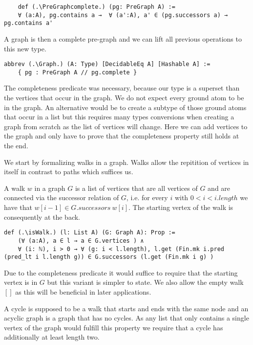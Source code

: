 \begin{lstlisting}
    def (.\PreGraphcomplete.) (pg: PreGraph A) := 
    ∀ (a:A), pg.contains a →  ∀ (a':A), a' ∈ (pg.successors a) → pg.contains a'
\end{lstlisting}

A graph is then a complete pre-graph and we can lift all previous operations to this new type.
\begin{lstlisting}
abbrev (.\Graph.) (A: Type) [DecidableEq A] [Hashable A] := 
    { pg : PreGraph A // pg.complete }
\end{lstlisting}

The completeness predicate was necessary, because our type is a superset than the vertices that occur in the graph. We do not expect every ground atom to be in the graph. An alternative would be to create a subtype of those ground atoms that occur in a list but this requires many types conversions when creating a graph from scratch as the list of vertices will change. Here we can add vertices to the graph and only have to prove that the completeness property still holds at the end.

We start by formalizing walks in a graph. Walks allow the repitition of vertices in itself in contrast to paths which suffices us.

A walk $w$ in a graph $G$ is a list of vertices that are all vertices of $G$ and are connected via the successor relation of $G$, i.e. for every $i$ with $0 < i < i.length$ we have that $w[i-1] \in G.successors\ w[i]$. The starting vertex of the walk is consequently at the back.

\begin{lstlisting}
def (.\isWalk.) (l: List A) (G: Graph A): Prop :=
    (∀ (a:A), a ∈ l → a ∈ G.vertices ) ∧ 
    ∀ (i: ℕ), i > 0 → ∀ (g: i < l.length), l.get (Fin.mk i.pred (pred_lt i l.length g)) ∈ G.successors (l.get (Fin.mk i g) )
\end{lstlisting}

Due to the completeness predicate it would suffice to require that the starting vertex is in $G$ but this variant is simpler to state. We also allow the empty walk $[]$ as this will be beneficial in later applications.

A cycle is supposed to be a walk that starts and ends with the same node and an acyclic graph is a graph that has no cycles. As any list that only contains a single vertex of the graph would fulfill this property we require that a cycle has additionally at least length two.

